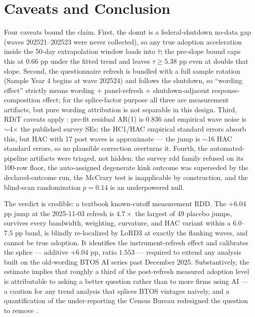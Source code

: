 \documentclass[11pt]{article}
\begin{document}
\section{Caveats and Conclusion}\label{sec:conclusion}

Four caveats bound the claim. First, the donut is a federal-shutdown no-data
gap (waves 202521--202523 were never collected), so any true adoption
acceleration inside the 50-day extrapolation window loads into $\hat\tau$;
the pre-slope bound caps this at $0.66$ pp under the fitted trend and leaves
$\tau \geq 5.38$ pp even at double that slope. Second, the questionnaire
refresh is bundled with a full sample rotation (Sample Year 4 begins at wave
202524) and follows the shutdown, so ``wording effect'' strictly means
wording $+$ panel-refresh $+$ shutdown-adjacent response-composition effect;
for the splice-factor purpose all three are measurement artifacts, but pure
wording attribution is not separable in this design. Third, RDiT caveats
apply \cite{hausman2018}: pre-fit residual AR(1) is $0.836$ and empirical
wave noise is $\sim$4$\times$ the published survey SEs; the HC1/HAC empirical
standard errors absorb this, but HAC with 17 post waves is approximate ---
the jump is $\sim$16 HAC standard errors, so no plausible correction
overturns it. Fourth, the automated-pipeline artifacts were triaged, not
hidden: the survey rdd family refused on its 100-row floor, the auto-assigned
degenerate kink outcome was superseded by the declared-outcome run, the
McCrary test is inapplicable by construction, and the blind-scan
randomization $p=0.14$ is an underpowered null.

The verdict is credible: a textbook known-cutoff measurement RDD. The
$+6.04$ pp jump at the 2025-11-03 refresh is $4.7\times$ the largest of 49
placebo jumps, survives every bandwidth, weighting, curvature, and HAC
variant within a $6.0$--$7.5$ pp band, is blindly re-localized by LoRD3 at
exactly the flanking waves, and cannot be true adoption. It identifies the
instrument-refresh effect and calibrates the splice --- additive $+6.04$ pp,
ratio $1.553$ --- required to extend any analysis built on the old-wording
BTOS AI series past December 2025. Substantively, the estimate implies that
roughly a third of the post-refresh measured adoption level is attributable
to asking a better question rather than to more firms using AI --- a caution
for any trend analysis that splices BTOS vintages naively, and a
quantification of the under-reporting the Census Bureau redesigned the
question to remove \cite{census2025,bick2026}.
\end{document}
